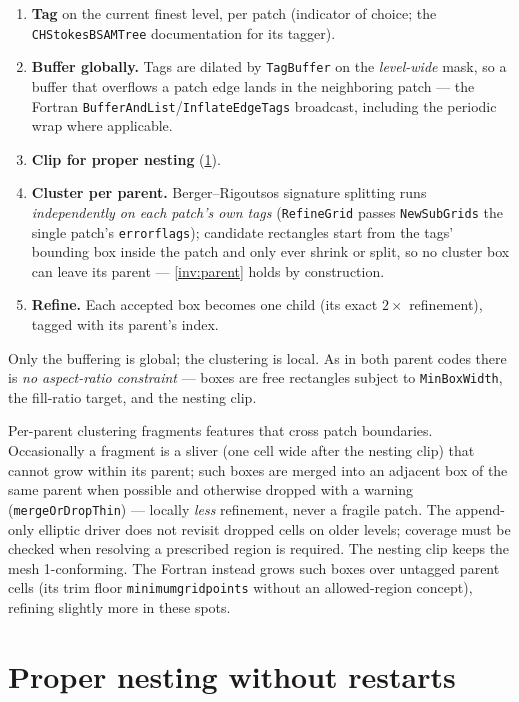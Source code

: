 \documentclass[11pt,oneside,openany]{book}
\newcommand{\code}[1]{\textnormal{\texttt{#1}}}
\begin{document}
\begin{enumerate}[leftmargin=2em]
\item \textbf{Tag} on the current finest level, per patch
(indicator of choice; the \code{CHStokesBSAMTree} documentation for its
tagger).
\item \textbf{Buffer globally.}  Tags are dilated by
\code{TagBuffer} on the \emph{level-wide} mask, so a buffer that
overflows a patch edge lands in the neighboring patch --- the Fortran
\code{BufferAndList}/\code{InflateEdgeTags} broadcast, including the
periodic wrap where applicable.
\item \textbf{Clip for proper nesting} (\cref{sec:nesting}).
\item \textbf{Cluster per parent.}  Berger--Rigoutsos signature
splitting runs \emph{independently on each patch's own tags}
(\code{RefineGrid} passes \code{NewSubGrids} the single patch's
\code{errorflags}); candidate rectangles start from the tags' bounding
box inside the patch and only ever shrink or split, so no cluster box
can leave its parent --- \cref{inv:parent} holds by construction.
\item \textbf{Refine.}  Each accepted box becomes one child (its exact
$2\times$ refinement), tagged with its parent's index.
\end{enumerate}

Only the buffering is global; the clustering is local.  As in both
parent codes there is \emph{no aspect-ratio constraint} --- boxes are
free rectangles subject to \code{MinBoxWidth}, the fill-ratio target,
and the nesting clip.

\begin{cautionbox}
Per-parent clustering fragments features that cross patch boundaries.
Occasionally a fragment is a sliver (one cell wide after the nesting
clip) that cannot grow within its parent; such boxes are merged into an
adjacent box of the same parent when possible and otherwise dropped
with a warning (\code{mergeOrDropThin}) --- locally \emph{less}
refinement, never a fragile patch.  The append-only elliptic driver
does not revisit dropped cells on older levels; coverage must be
checked when resolving a prescribed region is required.  The nesting
clip keeps the mesh 1-conforming.  The Fortran instead grows such boxes over untagged
parent cells (its trim floor \code{minimumgridpoints} without an
allowed-region concept), refining slightly more in these spots.
\end{cautionbox}

\section{Proper nesting without restarts}
\label{sec:nesting}
\end{document}
